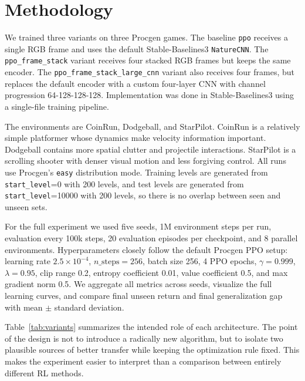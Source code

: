 \documentclass[10pt,twocolumn]{article}
\begin{document}
\section{Methodology}
We trained three variants on three Procgen games. The baseline \texttt{ppo} receives a single RGB frame and uses the default Stable-Baselines3 \texttt{NatureCNN}. The \texttt{ppo\_frame\_stack} variant receives four stacked RGB frames but keeps the same encoder. The \texttt{ppo\_frame\_stack\_large\_cnn} variant also receives four frames, but replaces the default encoder with a custom four-layer CNN with channel progression 64-128-128-128. Implementation was done in Stable-Baselines3 \citep{raffin2021sb3} using a single-file training pipeline.

The environments are CoinRun, Dodgeball, and StarPilot. CoinRun is a relatively simple platformer whose dynamics make velocity information important. Dodgeball contains more spatial clutter and projectile interactions. StarPilot is a scrolling shooter with denser visual motion and less forgiving control. All runs use Procgen's \texttt{easy} distribution mode. Training levels are generated from \texttt{start\_level}=0 with 200 levels, and test levels are generated from \texttt{start\_level}=10000 with 200 levels, so there is no overlap between seen and unseen sets.

For the full experiment we used five seeds, 1M environment steps per run, evaluation every 100k steps, 20 evaluation episodes per checkpoint, and 8 parallel environments. Hyperparameters closely follow the default Procgen PPO setup: learning rate $2.5\times 10^{-4}$, $n\_\text{steps}=256$, batch size 256, 4 PPO epochs, $\gamma=0.999$, $\lambda=0.95$, clip range 0.2, entropy coefficient 0.01, value coefficient 0.5, and max gradient norm 0.5. We aggregate all metrics across seeds, visualize the full learning curves, and compare final unseen return and final generalization gap with mean \(\pm\) standard deviation.

Table~\ref{tab:variants} summarizes the intended role of each architecture. The point of the design is not to introduce a radically new algorithm, but to isolate two plausible sources of better transfer while keeping the optimization rule fixed. This makes the experiment easier to interpret than a comparison between entirely different RL methods.
\end{document}
